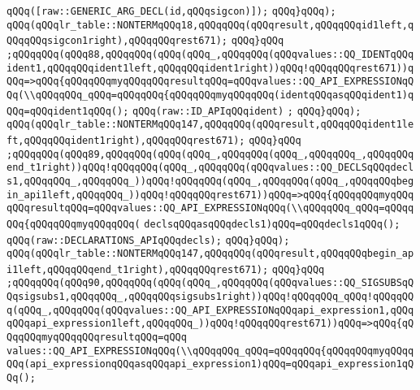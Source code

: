 \verb|qQQq([raw::GENERIC_ARG_DECL(id,qQQqsigcon)]);|\newline
\verb|qQQq}qQQq);|\newline
\verb|qQQq(qQQqlr_table::NONTERMqQQq18,qQQqqQQq(qQQqresult,qQQqqQQqid1left,qQQqqQQqsigcon1right),qQQqqQQqrest671);|\newline
\verb|qQQq}qQQq|\newline
\verb|;qQQqqQQq(qQQq88,qQQqqQQq(qQQq(qQQq_,qQQqqQQq(qQQqvalues::QQ_IDENTqQQqident1,qQQqqQQqident1left,qQQqqQQqident1right))qQQq!qQQqqQQqrest671))qQQq=>qQQq{qQQqqQQqmyqQQqqQQqresultqQQq=qQQqvalues::QQ_API_EXPRESSIONqQQq(\\qQQqqQQq_qQQq=qQQqqQQq{qQQqqQQqmyqQQqqQQq(identqQQqasqQQqident1)qQQq=qQQqident1qQQq();|\newline
\verb|qQQq(raw::ID_APIqQQqident)|\newline
\verb|;|\newline
\verb|qQQq}qQQq);|\newline
\verb|qQQq(qQQqlr_table::NONTERMqQQq147,qQQqqQQq(qQQqresult,qQQqqQQqident1left,qQQqqQQqident1right),qQQqqQQqrest671);|\newline
\verb|qQQq}qQQq|\newline
\verb|;qQQqqQQq(qQQq89,qQQqqQQq(qQQq(qQQq_,qQQqqQQq(qQQq_,qQQqqQQq_,qQQqqQQqend_t1right))qQQq!qQQqqQQq(qQQq_,qQQqqQQq(qQQqvalues::QQ_DECLSqQQqdecls1,qQQqqQQq_,qQQqqQQq_))qQQq!qQQqqQQq(qQQq_,qQQqqQQq(qQQq_,qQQqqQQqbegin_api1left,qQQqqQQq_))qQQq!qQQqqQQqrest671))qQQq=>qQQq{qQQqqQQqmyqQQqqQQqresultqQQq=qQQqvalues::QQ_API_EXPRESSIONqQQq(\\qQQqqQQq_qQQq=qQQqqQQq{qQQqqQQqmyqQQqqQQq(|\newline
\verb|declsqQQqasqQQqdecls1)qQQq=qQQqdecls1qQQq();|\newline
\verb|qQQq(raw::DECLARATIONS_APIqQQqdecls);|\newline
\verb|qQQq}qQQq);|\newline
\verb|qQQq(qQQqlr_table::NONTERMqQQq147,qQQqqQQq(qQQqresult,qQQqqQQqbegin_api1left,qQQqqQQqend_t1right),qQQqqQQqrest671);|\newline
\verb|qQQq}qQQq|\newline
\verb|;qQQqqQQq(qQQq90,qQQqqQQq(qQQq(qQQq_,qQQqqQQq(qQQqvalues::QQ_SIGSUBSqQQqsigsubs1,qQQqqQQq_,qQQqqQQqsigsubs1right))qQQq!qQQqqQQq_qQQq!qQQqqQQq(qQQq_,qQQqqQQq(qQQqvalues::QQ_API_EXPRESSIONqQQqapi_expression1,qQQqqQQqapi_expression1left,qQQqqQQq_))qQQq!qQQqqQQqrest671))qQQq=>qQQq{qQQqqQQqmyqQQqqQQqresultqQQq=qQQq|\newline
\verb|values::QQ_API_EXPRESSIONqQQq(\\qQQqqQQq_qQQq=qQQqqQQq{qQQqqQQqmyqQQqqQQq(api_expressionqQQqasqQQqapi_expression1)qQQq=qQQqapi_expression1qQQq();|\newline
